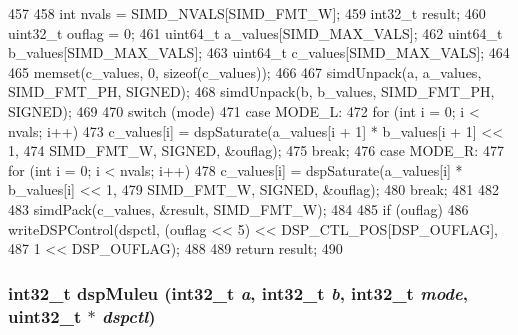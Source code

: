 \begin{DoxyCode}
457 {
458     int nvals = SIMD_NVALS[SIMD_FMT_W];
459     int32_t result;
460     uint32_t ouflag = 0;
461     uint64_t a_values[SIMD_MAX_VALS];
462     uint64_t b_values[SIMD_MAX_VALS];
463     uint64_t c_values[SIMD_MAX_VALS];
464 
465     memset(c_values, 0, sizeof(c_values));
466 
467     simdUnpack(a, a_values, SIMD_FMT_PH, SIGNED);
468     simdUnpack(b, b_values, SIMD_FMT_PH, SIGNED);
469 
470     switch (mode) {
471       case MODE_L:
472         for (int i = 0; i < nvals; i++)
473             c_values[i] = dspSaturate(a_values[i + 1] * b_values[i + 1] << 1,
474                                        SIMD_FMT_W, SIGNED, &ouflag);
475         break;
476       case MODE_R:
477         for (int i = 0; i < nvals; i++)
478             c_values[i] = dspSaturate(a_values[i] * b_values[i] << 1,
479                                        SIMD_FMT_W, SIGNED, &ouflag);
480         break;
481     }
482 
483     simdPack(c_values, &result, SIMD_FMT_W);
484 
485     if (ouflag)
486         writeDSPControl(dspctl, (ouflag << 5) << DSP_CTL_POS[DSP_OUFLAG],
487                         1 << DSP_OUFLAG);
488 
489     return result;
490 }
\end{DoxyCode}
\hypertarget{namespaceMipsISA_ad49f6da026197c52744cb3aa8fea0d39}{
\subsubsection[{dspMuleu}]{\setlength{\rightskip}{0pt plus 5cm}int32\_\-t dspMuleu (int32\_\-t {\em a}, \/  int32\_\-t {\em b}, \/  int32\_\-t {\em mode}, \/  {\bf uint32\_\-t} $\ast$ {\em dspctl})}}
\label{namespaceMipsISA_ad49f6da026197c52744cb3aa8fea0d39}



